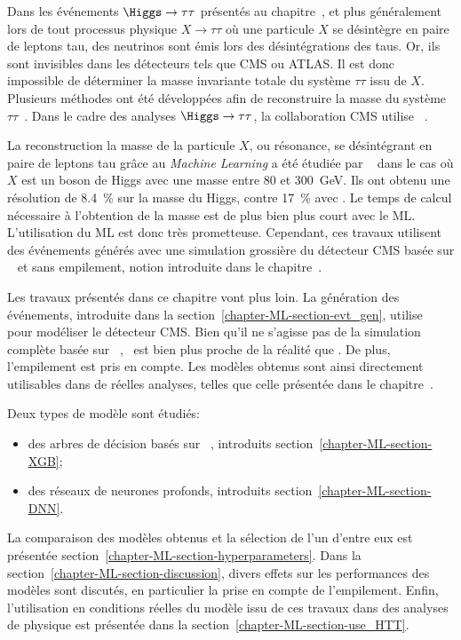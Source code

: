 \par
Dans les événements $\Higgs\to\tau\tau$ présentés au chapitre~,
et plus généralement lors de tout processus physique $X\to\tau\tau$ où une particule $X$ se désintègre en paire de leptons tau,
des neutrinos sont émis lors des désintégrations des taus.
Or, ils sont invisibles dans les détecteurs tels que CMS ou ATLAS.
Il est donc impossible de déterminer la masse invariante totale du système $\tau\tau$ issu de $X$.
Plusieurs méthodes ont été développées afin de reconstruire la masse du système $\tau\tau$~\cite{ELAGIN2011481,Barr_2011,Gripaios_2013}.
Dans le cadre des analyses $\Higgs\to\tau\tau$, la collaboration CMS utilise \SVFIT~\cite{SVFit_Bianchini_2014}.
\par
La reconstruction la masse de la particule $X$, ou résonance, se désintégrant en paire de leptons tau grâce au \emph{Machine Learning}
a été étudiée par \citeauthor{BARTSCHI201929}~\cite{BARTSCHI201929} dans le cas où $X$ est un boson de Higgs avec une masse entre \num{80} et \SI{300}{\GeV}.
Ils ont obtenu une résolution de \SI{8.4}{\%} sur la masse du Higgs, contre \SI{17}{\%} avec \SVFIT.
Le temps de calcul nécessaire à l'obtention de la masse est de plus bien plus court avec le ML.
L'utilisation du ML est donc très prometteuse.
Cependant,
ces travaux utilisent des événements générés
avec une simulation grossière du détecteur CMS basée sur
\DELPHES~\cite{Delphes,Delphes_additions}
et sans empilement, notion introduite dans le chapitre~.
\par
Les travaux présentés dans ce chapitre vont plus loin.
La génération des événements, introduite dans la section~\ref{chapter-ML-section-evt_gen},
utilise \FASTSIM~\cite{FastSim_2011,FastSim_2014,FastSim_2017_1,FastSim_2017_2}
pour modéliser le détecteur CMS.
Bien qu'il ne s'agisse pas de la simulation complète basée sur \GEANTfour~\cite{geant4_2003,geant4_2006,geant4_2016},
\FASTSIM\ est bien plus proche de la réalité que \DELPHES.
De plus, l'empilement est pris en compte.
Les modèles obtenus sont ainsi directement utilisables dans de réelles analyses, telles que celle présentée dans le chapitre~.
\par
Deux types de modèle sont étudiés:
\begin{itemize}
\item des arbres de décision basés sur \XGB~\cite{xgboost}, introduits section~\ref{chapter-ML-section-XGB};
\item des réseaux de neurones profonds, introduits section~\ref{chapter-ML-section-DNN}.
\end{itemize}
La comparaison des modèles obtenus et la sélection de l'un d'entre eux est présentée section~\ref{chapter-ML-section-hyperparameters}.
Dans la section~\ref{chapter-ML-section-discussion},
divers effets sur les performances des modèles sont discutés,
en particulier la prise en compte de l'empilement.
Enfin, l'utilisation en conditions réelles du modèle issu de ces travaux dans des analyses de physique est présentée dans la section~\ref{chapter-ML-section-use_HTT}.